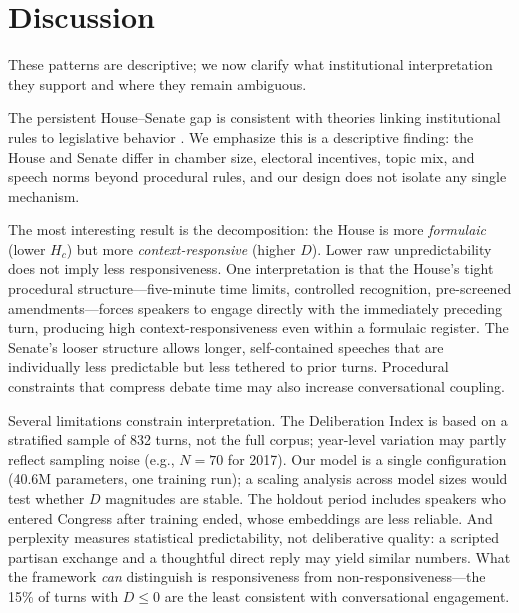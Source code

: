 \documentclass[12pt]{article}
\newcommand{\Hc}{H_c}
\newcommand{\DI}{\mathit{D}}
\begin{document}
\section{Discussion}

These patterns are descriptive; we now clarify what institutional interpretation they support and where they remain ambiguous.

The persistent House--Senate gap is consistent with theories linking institutional rules to legislative behavior \citep{perssonTabellini2000, perssonTabellini2003}. We emphasize this is a descriptive finding: the House and Senate differ in chamber size, electoral incentives, topic mix, and speech norms beyond procedural rules, and our design does not isolate any single mechanism.

The most interesting result is the decomposition: the House is more \textit{formulaic} (lower $\Hc$) but more \textit{context-responsive} (higher $\DI$). Lower raw unpredictability does not imply less responsiveness. One interpretation is that the House's tight procedural structure---five-minute time limits, controlled recognition, pre-screened amendments---forces speakers to engage directly with the immediately preceding turn, producing high context-responsiveness even within a formulaic register. The Senate's looser structure allows longer, self-contained speeches that are individually less predictable but less tethered to prior turns. Procedural constraints that compress debate time may also increase conversational coupling.

Several limitations constrain interpretation. The Deliberation Index is based on a stratified sample of 832 turns, not the full corpus; year-level variation may partly reflect sampling noise (e.g., $N = 70$ for 2017). Our model is a single configuration (40.6M parameters, one training run); a scaling analysis across model sizes would test whether $\DI$ magnitudes are stable. The holdout period includes speakers who entered Congress after training ended, whose embeddings are less reliable. And perplexity measures statistical predictability, not deliberative quality: a scripted partisan exchange and a thoughtful direct reply may yield similar numbers. What the framework \textit{can} distinguish is responsiveness from non-responsiveness---the 15\% of turns with $\DI \leq 0$ are the least consistent with conversational engagement.
\end{document}
